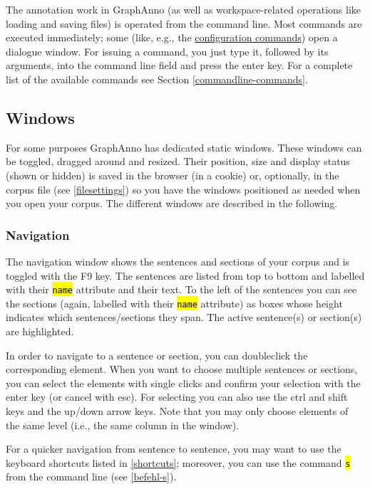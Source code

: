 \documentclass[12pt]{scrartcl}
\newcommand{\code}[1]{\hl{\texttt{#1}}}
\begin{document}
The annotation work in GraphAnno (as well as workspace-related operations like loading and saving files) is operated from the command line.
Most commands are executed immediately; some (like, e.g., the \hyperref[konfiguration]{configuration commands}) open a dialogue window.
For issuing a command, you just type it, followed by its arguments, into the command line field and press the enter key.
For a complete list of the available commands see Section \ref{commandline-commands}.


\subsection{Windows}\label{windows}

For some purposes GraphAnno has dedicated static windows.
These windows can be toggled, dragged around and resized.
Their position, size and display status (shown or hidden) is saved in the browser (in a cookie) or, optionally, in the corpus file (see \ref{filesettings}) so you have the windows positioned as needed when you open your corpus.
The different windows are described in the following.

\subsubsection{Navigation}\label{window-navigation}

The navigation window shows the sentences and sections of your corpus and is toggled with the F9 key.
The sentences are listed from top to bottom and labelled with their \code{name} attribute and their text.
To the left of the sentences you can see the sections (again, labelled with their \code{name} attribute) as boxes whose height indicates which sentences/sections they span.
The active sentence(s) or section(s) are highlighted.

In order to navigate to a sentence or section, you can doubleclick the corresponding element.
When you want to choose multiple sentences or sections, you can select the elements with single clicks and confirm your selection with the enter key (or cancel with esc).
For selecting you can also use the ctrl and shift keys and the up/down arrow keys.
Note that you may only choose elements of the same level (i.e., the same column in the window).

For a quicker navigation from sentence to sentence, you may want to use the keyboard shortcuts listed in \ref{shortcuts}; moreover, you can use the command \code{s} from the command line (see \ref{befehl-s}).
\end{document}
